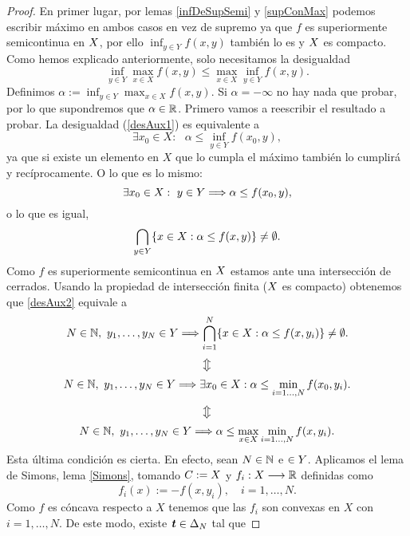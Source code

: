 \begin{proof}
En primer lugar, por lemas \ref{infDeSupSemi} y \ref{supConMax}  podemos escribir máximo en ambos casos en vez de supremo ya que $ f $ es superiormente semicontinua en $ X $, por ello $ \inf_{y \in Y} f(x,y) $ también lo es y $ X $ es compacto. Como hemos explicado anteriormente, solo necesitamos la desigualdad 
\begin{equation}\label{desAux1}
\inf_{y \in Y} \max_{x \in X} f(x,y) \leq \max_{x \in X} \inf_{y \in Y} f(x,y).
\end{equation}  Definimos $ \alpha := \inf_{y \in Y} \max_{x \in X} f(x,y) $. Si $ \alpha = -\infty $ no hay nada que probar, por lo que supondremos que $ \alpha \in \mathbb{R} $. Primero vamos a reescribir el resultado a probar. La desigualdad (\ref{desAux1}) es equivalente a
\[
\exists x_0 \in X:\text{ }\alpha \leq \inf_{y \in Y} f(x_0,y),
\]
ya que si existe un elemento en $ X $ que lo cumpla el máximo también lo cumplirá y recíprocamente. O lo que es lo mismo:
\[
\exists x_0 \in X:\text{ }y \in Y \Longrightarrow \alpha \leq f(x_0,y),
\]
o lo que es igual, 
\begin{equation}\label{desAux2}
\bigcap_{y\in Y}\{x \in X: \alpha \leq f(x, y) \} \neq \emptyset.
\end{equation}
Como $ f $ es superiormente semicontinua en $ X $ estamos ante una intersección de cerrados. Usando la propiedad de intersección finita ($ X $ es compacto) obtenemos que \eqref{desAux2} equivale a
\[
N\in\mathbb{N}, \text{ }y_1,\dots,y_N \in Y \Longrightarrow \bigcap_{i=1}^{N}\{x \in X: \alpha \leq f(x, y_i) \} \neq \emptyset.
\]
\[
\big\Updownarrow
\]
\[
N\in\mathbb{N}, \text{ }y_1,\dots,y_N \in Y \Longrightarrow \exists x_0\in X:\alpha \leq \min_{i=1\dots,N }f(x_0,y_i).
\]
\[
\big\Updownarrow
\]
\begin{equation}\label{desAux}
N\in\mathbb{N}, \text{ }y_1,\dots,y_N \in Y \Longrightarrow \alpha \leq \max_{x \in X} \min_{i=1\dots,N }f(x,y_i).
\end{equation}
Esta última condición es cierta. En efecto, sean $ N \in \mathbb{N} $ e $ \in Y$. Aplicamos el lema de Simons, lema \ref{Simons}, tomando $ C := X $ y $ f_i: X \longrightarrow \mathbb{R} $ definidas como \[
 f_i(x):=-f(x,y_i), \quad i=1,\dots,N.\]
Como $ f $ es cóncava respecto a $ X $ tenemos que las $ f_i $ son convexas en $ X $ con $  i=1,\dots,N $. De este modo, existe $ \textbf{\emph{t}} \in \Delta_N$ tal que

\end{proof}
